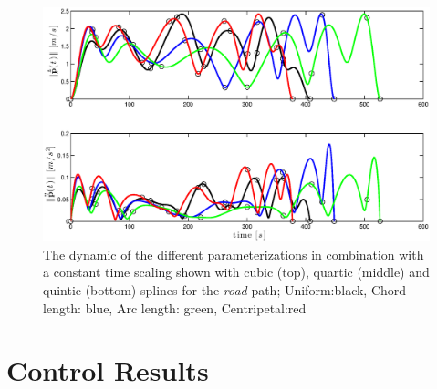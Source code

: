 \begin{figure}[H]
\begin{minipage}[t]{0.9\textwidth}
    \includegraphics[width = \textwidth]{graphics/Parameterization5_road_vel_acc.eps}
  \end{minipage}
  \caption{The dynamic of the different parameterizations in combination with a constant time scaling shown with cubic (top), quartic (middle) and quintic (bottom) splines for the \textit{road} path; Uniform:black, Chord length: blue, Arc length: green, Centripetal:red}
  \label{fig:parameterization_cqq}
\end{figure}

\section{Control Results}
\label{sec:app_trajectory_control_results}

